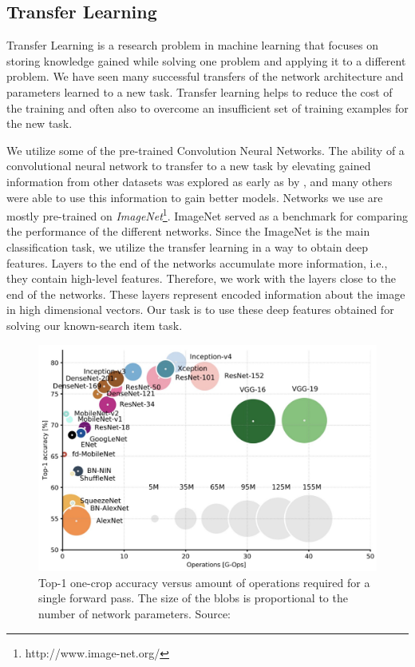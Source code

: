 \subsection{Transfer Learning}

Transfer Learning is a research problem in machine learning that focuses on storing knowledge gained while solving one problem and applying it to a different problem. We have seen many successful transfers of the network architecture and parameters learned to a new task. Transfer learning helps to reduce the cost of the training and often also to overcome an insufficient set of training examples for the new task.

We utilize some of the pre-trained Convolution Neural Networks. The ability of a convolutional neural network to transfer to a new task by elevating gained information from other datasets was explored as early as by \cite{donahuedeep}, and many others were able to use this information to gain better models.  Networks we use are mostly pre-trained on \emph{ImageNet}\footnote{http://www.image-net.org/}. ImageNet served as a benchmark for comparing the performance of the different networks. Since the ImageNet is the main classification task, we utilize the transfer learning in a way to obtain deep features. Layers to the end of the networks accumulate more information, i.e., they contain high-level features. Therefore, we work with the layers close to the end of the networks. These layers represent encoded information about the image in high dimensional vectors. Our task is to use these deep features obtained for solving our known-search item task.


\begin{figure}
    \centering
	\includegraphics[width=0.8\linewidth]{img/network-comparison.jpeg}
	\caption{Top-1 one-crop accuracy versus amount of operations required for a single forward pass. The size of the blobs is proportional to the number of network parameters. Source: \cite{canziani2016analysis}}
	\label{fig:camera-setup}
\end{figure}

